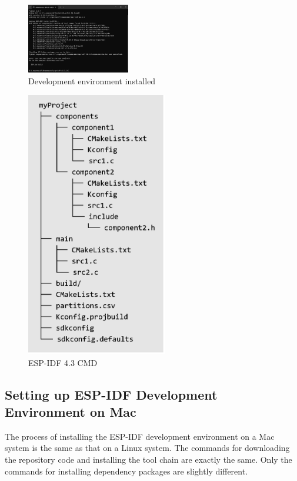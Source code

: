 \documentclass[a4paper,12pt,openany]{book}
\begin{document}
\begin{enumerate}[label=(\arabic*)]
    \begin{figure}[h!]
        \centering
        \includegraphics[width=0.4\textwidth,frame]{D4Z/4-13}
        \caption{Development environment installed}
        \label{Development environment installed}
    \end{figure}

    \begin{figure}[h!]
        \centering
        \includegraphics[width=0.55\textwidth]{D4Z/4-14}
        \caption{ESP-IDF 4.3 CMD}
        \label{ESP-IDF 4.3 CMD}
    \end{figure}
\end{enumerate}

\subsection{Setting up ESP-IDF Development Environment on Mac}
The process of installing the ESP-IDF development environment on a Mac system is the same as that on a Linux system. The commands for downloading the repository code and installing the tool chain are exactly the same. Only the commands for installing dependency packages are slightly different.
\end{document}
